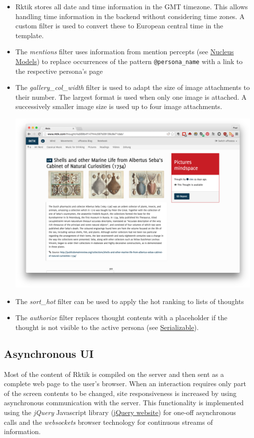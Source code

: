 \begin{itemize}
\item
  Rktik stores all date and time information in the GMT timezone. This
  allows handling time information in the backend without considering
  time zones. A custom filter is used to convert these to European
  central time in the template.
\item
  The \emph{mentions} filter uses information from mention percepts (see
  \hyperref[nucleus-models]{Nucleus Models}) to replace occurrences of
  the pattern \texttt{@persona\_name} with a link to the respective
  persona's page
\item
  The \emph{gallery\_col\_width} filter is used to adapt the size of
  image attachments to their number. The largest format is used when
  only one image is attached. A successively smaller image size is used
  up to four image attachments.

  \includegraphics{img/col_width.png}
\item
  The \emph{sort\_hot} filter can be used to apply the hot ranking to
  lists of thoughts
\item
  The \emph{authorize} filter replaces thought contents with a
  placeholder if the thought is not visible to the active persona (see
  \hyperref[serializable]{Serializable}).
\end{itemize}

\subsection{Asynchronous UI}\label{asynchronous-ui}

Most of the content of Rktik is compiled on the server and then sent as
a complete web page to the user's browser. When an interaction requires
only part of the screen contents to be changed, site responsiveness is
increased by using asynchronous communication with the server. This
functionality is implemented using the \emph{jQuery} Javascript library
(\href{https://jquery.com/}{jQuery website}) for one-off asynchronous
calls and the \emph{websockets} browser technology for continuous
streams of information.

